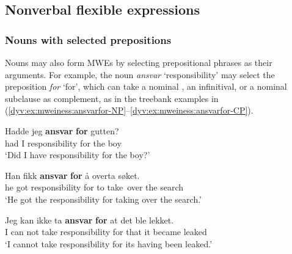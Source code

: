 \documentclass[output=paper]{langsci/langscibook}
\begin{document}
\subsection{Nonverbal flexible expressions}\label{dyv:sec:mweiness:nonverbal}

\subsubsection{Nouns with selected prepositions}\label{dyv:sec:mweiness:prepnoun}

Nouns may also form MWEs by selecting prepositional phrases as their arguments.
For example, the noun \textit{ansvar} `responsibility' may select the preposition \textit{for} `for', which can take a nominal , an infinitival, or a nominal subclause as complement, as in the treebank examples in (\ref{dyv:ex:mweiness:ansvarfor-NP}--\ref{dyv:ex:mweiness:ansvarfor-CP}).

\ea\label{dyv:ex:mweiness:ansvarfor-NP}
\gll Hadde jeg \textbf{ansvar} \textbf{for} gutten? \\
     had I responsibility for {the boy}\\
\glt `Did I have responsibility for the boy?'
\z


\ea\label{dyv:ex:mweiness:ansvarfor-inf}
\gll Han fikk \textbf{ansvar} \textbf{for} å overta søket. \\
     he got responsibility for to take over {the search}\\
\glt `He got the responsibility for taking over the search.'
\z


\ea\label{dyv:ex:mweiness:ansvarfor-CP}
\gll Jeg kan ikke ta \textbf{ansvar} \textbf{for} at det ble lekket. \\
    I can not take responsibility for that it became leaked\\
\glt `I cannot take responsibility for its having been leaked.'
\z
\end{document}

